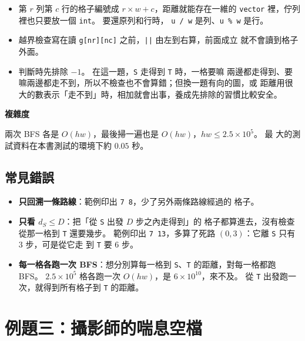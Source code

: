 
\begin{itemize}
\item 第 $r$ 列第 $c$ 行的格子編號成 $r \times w + c$，距離就能存在一維的
\texttt{vector} 裡，佇列裡也只要放一個 \texttt{int}。 要還原列和行時，
\texttt{u / w} 是列、\texttt{u \% w} 是行。
\item 越界檢查寫在讀 \texttt{g[nr][nc]} 之前，\texttt{||} 由左到右算，前面成立
就不會讀到格子外面。
\item 判斷時先排除 $-1$。 在這一題，\texttt{S} 走得到 \texttt{T} 時，一格要嘛
兩邊都走得到、要嘛兩邊都走不到，所以不檢查也不會算錯；但換一題有向的圖，或
距離用很大的數表示「走不到」時，相加就會出事，養成先排除的習慣比較安全。
\end{itemize}

\textbf{複雜度}

兩次 BFS 各是 $O(hw)$，最後掃一遍也是 $O(hw)$，$hw \le 2.5 \times 10^5$。 最
大的測試資料在本書測試的環境下約 $0.05$ 秒。

\subsection{常見錯誤}

\begin{itemize}
\item \textbf{只回溯一條路線}：範例印出 \texttt{7 8}，少了另外兩條路線經過的
格子。
\item \textbf{只看 $d_S \le D$}：把「從 \texttt{S} 出發 $D$ 步之內走得到」的
格子都算進去，沒有檢查從那一格到 \texttt{T} 還要幾步。 範例印出
\texttt{7 13}，多算了死路 $(0, 3)$：它離 \texttt{S} 只有 $3$ 步，可是從它走
到 \texttt{T} 要 $6$ 步。
\item \textbf{每一格各跑一次 BFS}：想分別算每一格到 \texttt{S}、\texttt{T}
的距離，對每一格都跑 BFS。 $2.5 \times 10^5$ 格各跑一次 $O(hw)$，是
$6 \times 10^{10}$，來不及。 從 \texttt{T} 出發跑一次，就得到所有格子到
\texttt{T} 的距離。
\end{itemize}

\section{例題三：攝影師的喘息空檔}
\label{sec:cap-breather}

